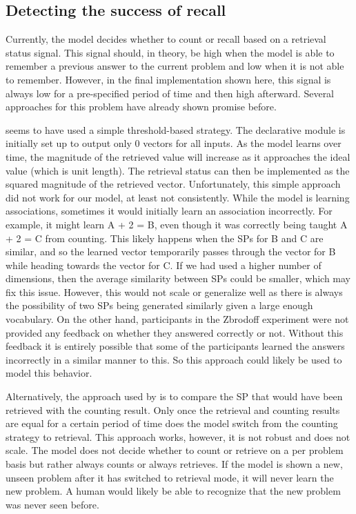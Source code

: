 \documentclass[10pt, a4paper, twocolumn]{article}
\begin{document}
\subsection{Detecting the success of recall}

Currently, the model decides whether to count or recall based on a retrieval status signal. This signal should, in theory, be high when the model is able to remember a previous answer to the current problem and low when it is not able to remember. However, in the final implementation shown here, this signal is always low for a pre-specified period of time and then high afterward. Several approaches for this problem have already shown promise before.

\cite{Praetorius} seems to have used a simple threshold-based strategy. The declarative module is initially set up to output only 0 vectors for all inputs. As the model learns over time, the magnitude of the retrieved value will increase as it approaches the ideal value (which is unit length). The retrieval status can then be implemented as the squared magnitude of the retrieved vector. 
Unfortunately, this simple approach did not work for our model, at least not consistently. While the model is learning associations, sometimes it would initially learn an association incorrectly. For example, it might learn A + 2 = B, even though it was correctly being taught A + 2 = C from counting. This likely happens when the SPs for B and C are similar, and so the learned vector temporarily passes through the vector for B while heading towards the vector for C. If we had used a higher number of dimensions, then the average similarity between SPs could be smaller, which may fix this issue. However, this would not scale or generalize well as there is always the possibility of two SPs being generated similarly given a large enough vocabulary. On the other hand, participants in the Zbrodoff experiment were not provided any feedback on whether they answered correctly or not. Without this feedback it is entirely possible that some of the participants learned the answers incorrectly in a similar manner to this. So this approach could likely be used to model this behavior.

Alternatively, the approach used by \cite{Aubin2016} is to compare the SP that would have been retrieved with the counting result. Only once the retrieval and counting results are equal for a certain period of time does the model switch from the counting strategy to retrieval. This approach works, however, it is not robust and does not scale. The model does not decide whether to count or retrieve on a per problem basis but rather always counts or always retrieves. If the model is shown a new, unseen problem after it has switched to retrieval mode, it will never learn the new problem. A human would likely be able to recognize that the new problem was never seen before.
\end{document}
